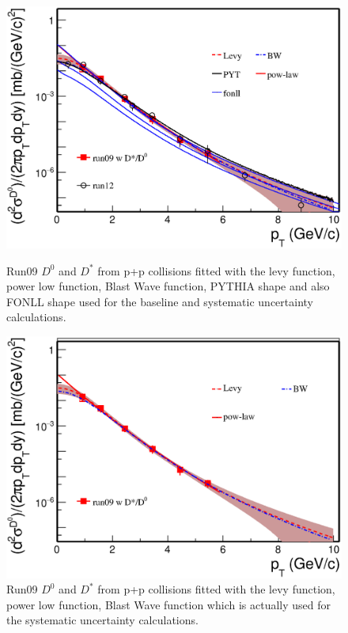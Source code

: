 \begin{figure}[htbp]
\begin{minipage}[htbp]{0.47\linewidth}
\centering
\includegraphics[width=1.0\textwidth,angle=0]{figure/Run14_D0HFT/pp_baseLine1.eps}
\caption{Run09 $D^{0}$ and $D^*$ from p+p collisions fitted with the levy function, power low function, Blast Wave function, PYTHIA shape and also FONLL shape used for the baseline and systematic uncertainty calculations. \label{pp_baseLine1}}
\end{minipage}
\hfill
\begin{minipage}[htbp]{0.47\linewidth}
\centering
\includegraphics[width=1.0\textwidth,angle=0]{figure/Run14_D0HFT/pp_baseLine2.eps}
\caption{Run09 $D^{0}$ and $D^*$ from p+p collisions fitted with the levy function, power low function, Blast Wave function which is actually used for the systematic uncertainty calculations. \label{pp_baseLine2}}
\end{minipage}
\end{figure}

